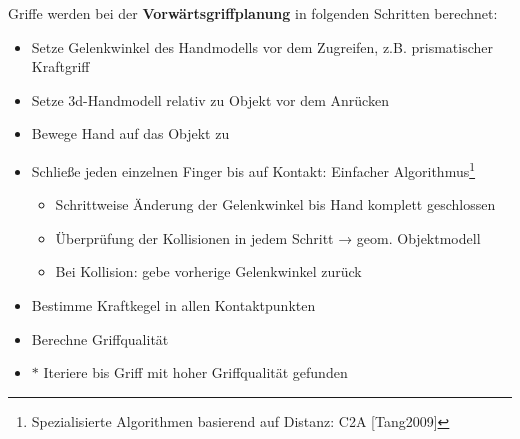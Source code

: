 Griffe werden bei der \textbf{Vorwärtsgriffplanung} in folgenden Schritten berechnet:
\begin{itemize}
\item[1.] Setze Gelenkwinkel des Handmodells vor dem Zugreifen, z.B. prismatischer Kraftgriff
\item[2.] Setze 3d-Handmodell relativ zu Objekt vor dem Anrücken
\item[3.] Bewege Hand auf das Objekt zu
\item[4.] Schließe jeden einzelnen Finger bis auf Kontakt: Einfacher Algorithmus\footnote{Spezialisierte Algorithmen basierend auf Distanz: C2A [Tang2009]}
\begin{itemize}
\item[1.] Schrittweise Änderung der Gelenkwinkel bis Hand komplett geschlossen
\item[2.] Überprüfung der Kollisionen in jedem Schritt → geom. Objektmodell
\item[3.] Bei Kollision: gebe vorherige Gelenkwinkel zurück
\end{itemize}
\item[5.] Bestimme Kraftkegel in allen Kontaktpunkten
\item[6.] Berechne Griffqualität
\item[7.] $\ast$ Iteriere bis Griff mit hoher Griffqualität gefunden
\end{itemize}
